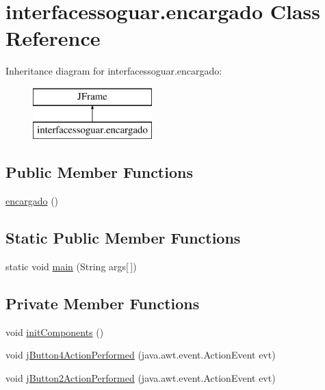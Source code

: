 \hypertarget{classinterfacessoguar_1_1encargado}{}\section{interfacessoguar.\+encargado Class Reference}
\label{classinterfacessoguar_1_1encargado}
Inheritance diagram for interfacessoguar.\+encargado\+:\begin{figure}[H]
\begin{center}
\leavevmode
\includegraphics[height=2.000000cm]{classinterfacessoguar_1_1encargado}
\end{center}
\end{figure}
\subsection*{Public Member Functions}
\begin{DoxyCompactItemize}
\item 
\mbox{\hyperlink{classinterfacessoguar_1_1encargado_a7ddc5de97eb0929c44ecc46246a58a32}{encargado}} ()
\end{DoxyCompactItemize}
\subsection*{Static Public Member Functions}
\begin{DoxyCompactItemize}
\item 
static void \mbox{\hyperlink{classinterfacessoguar_1_1encargado_aff744ed614e4511478a42b027606a6bf}{main}} (String args\mbox{[}$\,$\mbox{]})
\end{DoxyCompactItemize}
\subsection*{Private Member Functions}
\begin{DoxyCompactItemize}
\item 
void \mbox{\hyperlink{classinterfacessoguar_1_1encargado_ac178104196403dd279dd6b1ebe64b227}{init\+Components}} ()
\item 
void \mbox{\hyperlink{classinterfacessoguar_1_1encargado_a60322c297cc3f0d5c9cbc4ca4b896712}{j\+Button4\+Action\+Performed}} (java.\+awt.\+event.\+Action\+Event evt)
\item 
void \mbox{\hyperlink{classinterfacessoguar_1_1encargado_a4a03ba85f374b1b38e4f5c2ca80aa0cc}{j\+Button2\+Action\+Performed}} (java.\+awt.\+event.\+Action\+Event evt)
\end{DoxyCompactItemize}
